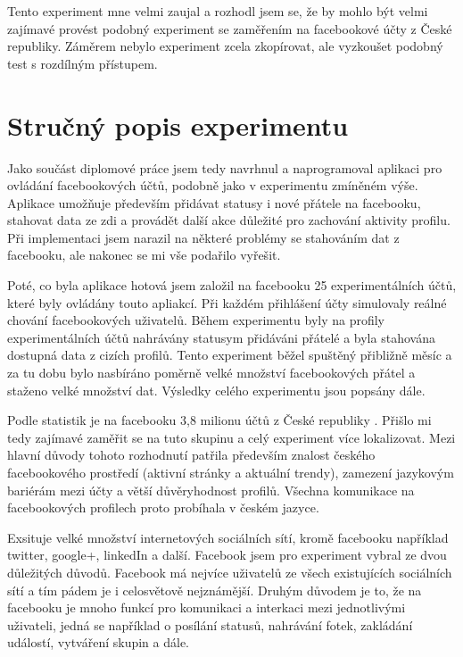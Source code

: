 \documentclass[thesis=M,czech]{FITthesis}[2013/05/10]
\begin{document}
Tento experiment mne velmi zaujal a rozhodl jsem se, že by mohlo být velmi zajímavé provést podobný experiment se zaměřením na facebookové účty z České republiky. Záměrem nebylo experiment zcela zkopírovat, ale vyzkoušet podobný test s rozdílným přístupem. 

\section{Stručný popis experimentu}

Jako součást diplomové práce jsem tedy navrhnul a naprogramoval aplikaci pro ovládání facebookových účtů, podobně jako v experimentu zmíněném výše. Aplikace umožňuje především přidávat statusy i nové přátele na facebooku, stahovat data ze zdi a provádět další akce důležité pro zachování aktivity profilu. Při implementaci jsem narazil na některé problémy se stahováním dat z facebooku, ale nakonec se mi vše podařilo vyřešit.

Poté, co byla aplikace hotová jsem založil na facebooku 25 experimentálních účtů, které byly ovládány touto apliakcí. Při každém přihlášení účty simulovaly reálné chování facebookových uživatelů. Během experimentu byly na profily experimentálních účtů nahrávány statusym přidáváni přátelé a byla stahována dostupná data z cizích profilů. Tento experiment běžel spuštěný přibližně měsíc a za tu dobu bylo nasbíráno poměrně velké množství facebookových přátel a staženo velké množství dat. Výsledky celého experimentu jsou popsány dále.

Podle statistik je na facebooku 3,8 milionu účtů z České republiky \cite{web:fbCzechUsers}. Přišlo mi tedy zajímavé zaměřit se na tuto skupinu a celý experiment více lokalizovat. Mezi hlavní důvody tohoto rozhodnutí patřila především znalost českého facebookového prostředí (aktivní stránky a aktuální trendy), zamezení jazykovým bariérám mezi účty a větší důvěryhodnost profilů. Všechna komunikace na facebookových profilech proto probíhala v českém jazyce.

Exsituje velké množství internetových sociálních sítí, kromě facebooku například twitter, google+, linkedIn a další. Facebook jsem pro experiment vybral ze dvou důležitých důvodů. Facebook má nejvíce uživatelů ze všech existujících sociálních sítí a tím pádem je i celosvětově nejznámější. Druhým důvodem je to, že na facebooku je mnoho funkcí pro komunikaci a interkaci mezi jednotlivými uživateli, jedná se například o posílání statusů, nahrávání fotek, zakládání událostí, vytváření skupin a dále.
\end{document}
